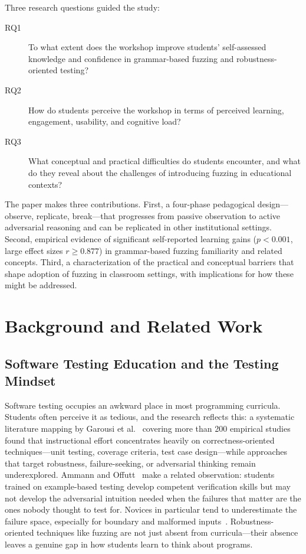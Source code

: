 \documentclass[conference]{IEEEtran}
\begin{document}
Three research questions guided the study:
\begin{description}
    \item[RQ1] To what extent does the workshop improve students' self-assessed knowledge and confidence in grammar-based fuzzing and robustness-oriented testing?
    \item[RQ2] How do students perceive the workshop in terms of perceived learning, engagement, usability, and cognitive load?
    \item[RQ3] What conceptual and practical difficulties do students encounter, and what do they reveal about the challenges of introducing fuzzing in educational contexts?
\end{description}

The paper makes three contributions.
First, a four-phase pedagogical design---observe, replicate, break---that progresses from passive observation to active adversarial reasoning and can be replicated in other institutional settings.
Second, empirical evidence of significant self-reported learning gains ($p < 0.001$, large effect sizes $r \geq 0.877$) in grammar-based fuzzing familiarity and related concepts.
Third, a characterization of the practical and conceptual barriers that shape adoption of fuzzing in classroom settings, with implications for how these might be addressed.

\section{Background and Related Work}
\label{sec:background}

\subsection{Software Testing Education and the Testing Mindset}

Software testing occupies an awkward place in most programming curricula.
Students often perceive it as tedious, and the research reflects this: a systematic literature mapping by Garousi et al.~\cite{garousi2020testing} covering more than 200 empirical studies found that instructional effort concentrates heavily on correctness-oriented techniques---unit testing, coverage criteria, test case design---while approaches that target robustness, failure-seeking, or adversarial thinking remain underexplored.
Ammann and Offutt~\cite{ammann2016introduction} make a related observation: students trained on example-based testing develop competent verification skills but may not develop the adversarial intuition needed when the failures that matter are the ones nobody thought to test for.
Novices in particular tend to underestimate the failure space, especially for boundary and malformed inputs~\cite{mccauley2008debugging}.
Robustness-oriented techniques like fuzzing are not just absent from curricula---their absence leaves a genuine gap in how students learn to think about programs.
\end{document}
